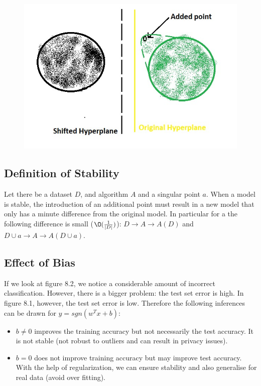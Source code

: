 \documentclass[11pt, twosides]{article}
\begin{document}
\begin{figure}[htbp]
\begin{center}
\includegraphics[scale=0.43]{419_4.jpeg}
\caption{}
\end{center}
\end{figure}


\subsection{Definition of Stability}

Let there be a dataset $D$, and algorithm $A$ and a singular point $a$. When a model is stable, the introduction of an additional point must result in a new model that only has a minute difference from the original model.
In particular for a  the following difference is small ($\O(\frac{1}{|D|})$):
$D \rightarrow A \rightarrow A(D)$ and $D\cup a \rightarrow A \rightarrow A(D\cup a)$. 

\subsection{Effect of Bias}
If we look at figure 8.2, we notice a considerable amount of incorrect classification. However, there is a bigger problem: the test set error is high. In figure 8.1, however, the test set error is low. Therefore the following inferences can be drawn for $y = sgn(w^Tx +b)$:
\begin{itemize}
    \item $b\neq 0$ improves the training accuracy but not necessarily the test accuracy. It is not stable (not robust to outliers and can result in privacy issues).
    \item $b=0$ does not improve training accuracy but may improve test accuracy. With the help of regularization, we can ensure stability and also generalise for real data (avoid over fitting).
\end{itemize}
\end{document}

